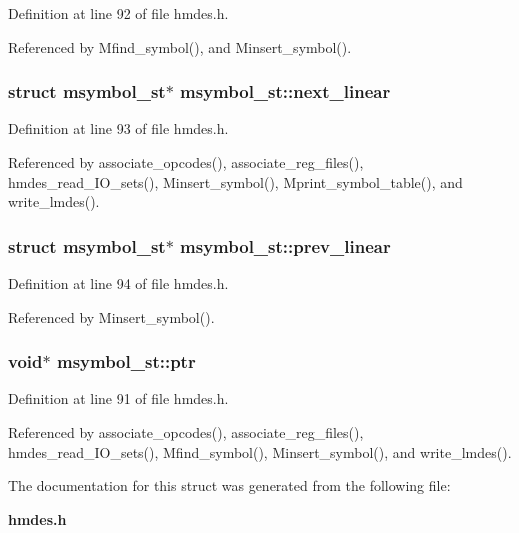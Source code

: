 Definition at line 92 of file hmdes.h.

Referenced by Mfind\_\-symbol(), and Minsert\_\-symbol().
\subsubsection{\setlength{\rightskip}{0pt plus 5cm}struct \bf{msymbol\_\-st}$\ast$ \bf{msymbol\_\-st::next\_\-linear}}\label{structmsymbol__st_3ae57a496e08aa6b3cfdaac96db12241}




Definition at line 93 of file hmdes.h.

Referenced by associate\_\-opcodes(), associate\_\-reg\_\-files(), hmdes\_\-read\_\-IO\_\-sets(), Minsert\_\-symbol(), Mprint\_\-symbol\_\-table(), and write\_\-lmdes().
\subsubsection{\setlength{\rightskip}{0pt plus 5cm}struct \bf{msymbol\_\-st}$\ast$ \bf{msymbol\_\-st::prev\_\-linear}}\label{structmsymbol__st_b4c16591e4c880a87d53dfc4ff5202f5}




Definition at line 94 of file hmdes.h.

Referenced by Minsert\_\-symbol().
\subsubsection{\setlength{\rightskip}{0pt plus 5cm}void$\ast$ \bf{msymbol\_\-st::ptr}}\label{structmsymbol__st_9cf9b630400e233fe0d3e88fd9890a70}




Definition at line 91 of file hmdes.h.

Referenced by associate\_\-opcodes(), associate\_\-reg\_\-files(), hmdes\_\-read\_\-IO\_\-sets(), Mfind\_\-symbol(), Minsert\_\-symbol(), and write\_\-lmdes().

The documentation for this struct was generated from the following file:\begin{CompactItemize}
\item 
\bf{hmdes.h}\end{CompactItemize}
